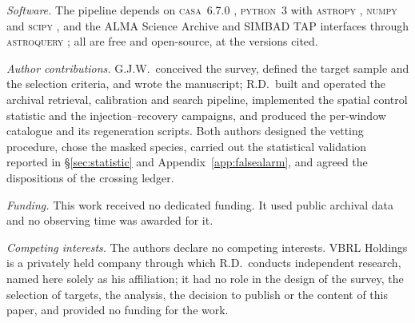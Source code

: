 \emph{Software.} The pipeline depends on \textsc{casa}~6.7.0
\citep{CASA2022}, \textsc{python}~3 with \textsc{astropy} \citep{Astropy2022}, \textsc{numpy}
\citep{Harris2020} and \textsc{scipy} \citep{Virtanen2020}, and the ALMA Science
Archive and SIMBAD TAP interfaces through \textsc{astroquery} \citep{Ginsburg2019};
all are free and open-source, at the versions cited.

\emph{Author contributions.} G.J.W.\ conceived the survey, defined the target
sample and the selection criteria, and wrote the manuscript; R.D.\ built and
operated the archival retrieval, calibration and search pipeline, implemented
the spatial control statistic and the injection--recovery campaigns, and
produced the per-window catalogue and its regeneration scripts. Both authors
designed the vetting procedure, chose the masked species, carried out the
statistical validation reported in \S\ref{sec:statistic} and
Appendix~\ref{app:falsealarm}, and agreed the dispositions of the crossing
ledger.

\emph{Funding.} This work received no dedicated funding. It used public archival data and
no observing time was awarded for it.

\emph{Competing interests.} The authors declare no competing interests. VBRL Holdings is a privately
held company through which R.D.\ conducts independent research, named
here solely as his affiliation; it had no role in the design of the
survey, the selection of targets, the analysis, the decision to publish
or the content of this paper, and provided no funding for the work.

